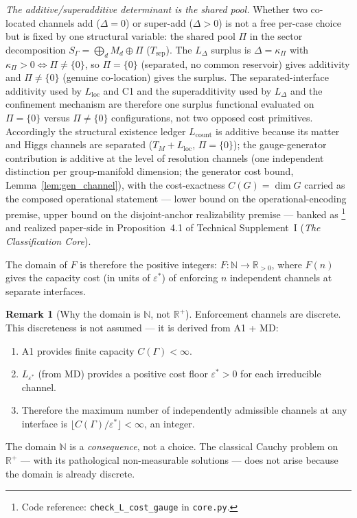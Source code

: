 \documentclass[11pt]{article}
\theoremstyle{definition}
\newtheorem{remark}[theorem]{Remark}
\newcommand{\coderef}[2]{\footnote{Code reference: \texttt{#1} in \texttt{#2}.}}
\newcommand{\TSI}{Technical Supplement~I (\emph{The Classification Core})}
\begin{document}
\smallskip\noindent\textit{The additive/superadditive determinant is the shared pool.}\quad
Whether two co-located channels add ($\Delta = 0$) or super-add ($\Delta > 0$) is
not a free per-case choice but is fixed by one structural variable: the shared
pool $\Pi$ in the sector decomposition $S_\Gamma = \bigoplus_d M_d \oplus \Pi$
($T_{\mathrm{sep}}$).  The $L_\Delta$ surplus is $\Delta = \kappa_\Pi$ with
$\kappa_\Pi > 0 \iff \Pi \neq \{0\}$, so $\Pi = \{0\}$ (separated, no common
reservoir) gives additivity and $\Pi \neq \{0\}$ (genuine co-location) gives the
surplus.  The separated-interface additivity used by $L_{\mathrm{loc}}$ and C1 and
the superadditivity used by $L_\Delta$ and the confinement mechanism are therefore
one surplus functional evaluated on $\Pi = \{0\}$ versus $\Pi \neq \{0\}$
configurations, not two opposed cost primitives.  Accordingly the structural
existence ledger $L_{\mathrm{count}}$ is additive because its matter and Higgs
channels are separated ($T_M + L_{\mathrm{loc}}$, $\Pi = \{0\}$); the
gauge-generator contribution is additive at the level of resolution
channels (one independent distinction per group-manifold dimension; the
generator cost bound, Lemma~\ref{lem:gen_channel}), with the cost-exactness
$C(G) = \dim G$ carried as the composed operational statement --- lower
bound on the operational-encoding premise, upper bound on the
disjoint-anchor realizability premise --- banked as
\coderef{check\_L\_cost\_gauge}{core.py} and realized paper-side in
Proposition~4.1 of \TSI{}.

\noindent The domain of $F$ is therefore the positive integers:
$F: \mathbb{N} \to \mathbb{R}_{>0}$, where $F(n)$ gives the capacity
cost (in units of $\varepsilon^*$) of enforcing $n$ independent channels
at separate interfaces.

\begin{remark}[Why the domain is $\mathbb{N}$, not $\mathbb{R}^+$]
\label{rem:domain_N}
Enforcement channels are discrete.  This discreteness is not assumed ---
it is derived from A1 + MD:
\begin{enumerate}[label=(\roman*),nosep]
  \item A1 provides finite capacity $C(\Gamma) < \infty$.
  \item $L_{\varepsilon^*}$ (from MD) provides a positive cost floor
        $\varepsilon^* > 0$ for each irreducible channel.
  \item Therefore the maximum number of independently admissible channels
        at any interface is $\lfloor C(\Gamma) / \varepsilon^* \rfloor
        < \infty$, an integer.
\end{enumerate}
The domain $\mathbb{N}$ is a \emph{consequence}, not a choice.  The
classical Cauchy problem on $\mathbb{R}^+$ --- with its pathological
non-measurable solutions --- does not arise because the domain is
already discrete.
\end{remark}
\end{document}
